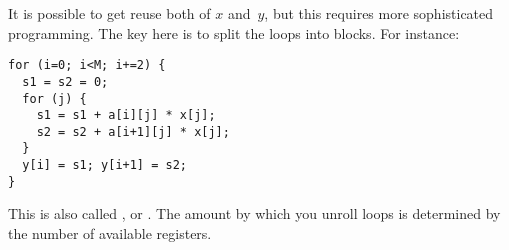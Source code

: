 It is possible to get reuse both of $x$ and~$y$, but this requires
more sophisticated programming. The key here is to split the loops into
blocks. For instance:
\begin{verbatim}
for (i=0; i<M; i+=2) {
  s1 = s2 = 0;
  for (j) {
    s1 = s1 + a[i][j] * x[j];
    s2 = s2 + a[i+1][j] * x[j];
  }
  y[i] = s1; y[i+1] = s2;
}
\end{verbatim}
This is also called ,
or . The amount by which you unroll
loops is determined by the number of available registers.



